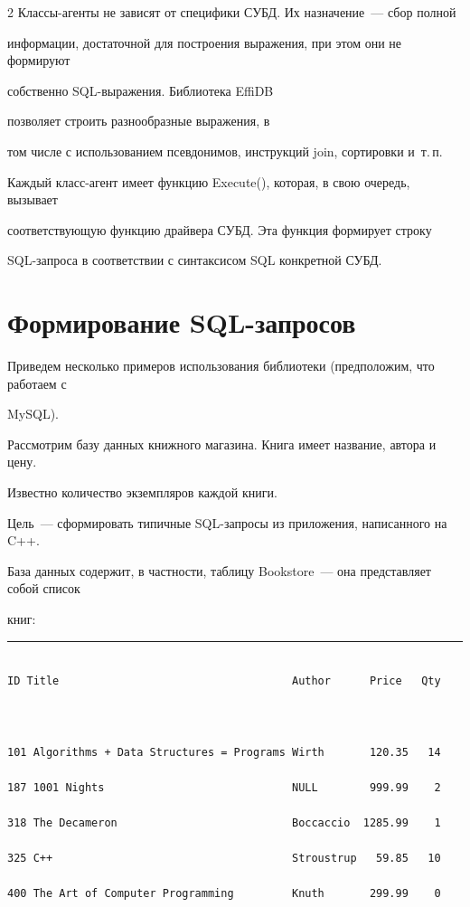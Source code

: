 \begin{multicols}{2}
Классы-агенты не зависят от специфики СУБД. Их назначение~--- сбор полной 

информации, достаточной для построения выражения, при этом они не формируют 

собственно SQL-вы\-ра\-же\-ния. Биб\-лиотека \mbox{EffiDB} 

позволяет строить разнообразные выражения, в 

том числе с использованием псевдонимов, инструкций join, сортировки и~т.\,п.



Каждый класс-агент имеет функцию {\sf Execute()}, которая, в свою очередь, вызывает 

соот\-вет\-ст\-ву\-ющую функцию драйвера СУБД. Эта функция формирует строку 

SQL-за\-про\-са в соответствии с синтаксисом SQL конкретной СУБД.



\section{Формирование SQL-запросов}



Приведем несколько примеров использования библиотеки (предположим, что работаем с 

MySQL).



Рассмотрим базу данных книжного магазина. Книга имеет название, автора и цену. 

Известно количество экземпляров каждой книги.



Цель~--- сформировать типичные SQL-запросы из приложения, написанного на C++.



База данных содержит, в частности, таблицу Bookstore~--- она представляет собой список 

книг: 



\end{multicols}



\hrule



\begin{verbatim}

ID Title                                    Author      Price   Qty



101 Algorithms + Data Structures = Programs Wirth       120.35   14

187 1001 Nights                             NULL        999.99    2

318 The Decameron                           Boccaccio  1285.99    1

325 C++                                     Stroustrup   59.85   10

400 The Art of Computer Programming         Knuth       299.99    0

\end{verbatim}



